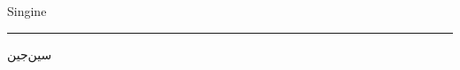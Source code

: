 \documentclass[a4paper]{article}
\begin{document}
\begin{center}

  {\latinfont\fontsize{90pt}{108pt}\selectfont
   \textcolor{inkblack}{Singine}}

  \vspace{6pt}
  \textcolor{hairline}{\rule{0.7\linewidth}{0.4pt}}
  \vspace{6pt}

  \begin{RTL}
    {\persianfont\fontsize{82pt}{98pt}\selectfont
     \textcolor{manuredred}{سین‌جین}}
  \end{RTL}

\end{center}
\end{document}
